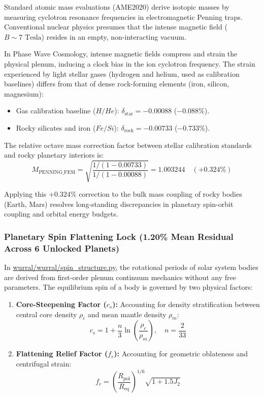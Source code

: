 \documentclass[11pt,a4paper]{article}
\begin{document}
Standard atomic mass evaluations (AME2020) derive isotopic masses by measuring cyclotron resonance frequencies in electromagnetic Penning traps. Conventional nuclear physics presumes that the intense magnetic field ($B \sim 7\text{ Tesla}$) resides in an empty, non-interacting vacuum.

In Phase Wave Cosmology, intense magnetic fields compress and strain the physical plenum, inducing a clock bias in the ion cyclotron frequency. The strain experienced by light stellar gases (hydrogen and helium, used as calibration baselines) differs from that of dense rock-forming elements (iron, silicon, magnesium):
\begin{itemize}
    \item Gas calibration baseline ($H/He$): $\delta_{\text{star}} = -0.00088$ ($-0.088\%$).
    \item Rocky silicates and iron ($Fe/Si$): $\delta_{\text{rock}} = -0.00733$ ($-0.733\%$).
\end{itemize}

The relative octave mass correction factor between stellar calibration standards and rocky planetary interiors is:
\begin{equation}
M_{\text{PENNING\_FESI}} = \sqrt{ \frac{1 / (1 - 0.00733)}{1 / (1 - 0.00088)} } = \mathbf{1.003244} \quad (+0.324\%)
\label{eq:penning_correction_fesi}
\end{equation}

Applying this $+0.324\%$ correction to the bulk mass coupling of rocky bodies (Earth, Mars) resolves long-standing discrepancies in planetary spin-orbit coupling and orbital energy budgets.

\subsubsection{Planetary Spin Flattening Lock (1.20\% Mean Residual Across 6 Unlocked Planets)}
\label{subsubsec:planetary_spin_lock}

In \url{wurral/wurral/spin_structure.py}, the rotational periods of solar system bodies are derived from first-order plenum continuum mechanics without any free parameters. The equilibrium spin of a body is governed by two physical factors:
\begin{enumerate}
    \item \textbf{Core-Steepening Factor ($c_s$):} Accounting for density stratification between central core density $\rho_c$ and mean mantle density $\rho_m$:
    \begin{equation}
    c_s = 1 + \frac{n}{3} \ln\left( \frac{\rho_c}{\rho_m} \right), \quad n = \frac{2}{33}
    \label{eq:core_steepening}
    \end{equation}
    \item \textbf{Flattening Relief Factor ($f_r$):} Accounting for geometric oblateness and centrifugal strain:
    \begin{equation}
    f_r = \left( \frac{R_{\text{pol}}}{R_{\text{eq}}} \right)^{1/6} \sqrt{1 + 1.5 J_2}
    \label{eq:flattening_relief}
    \end{equation}
\end{enumerate}
\end{document}
